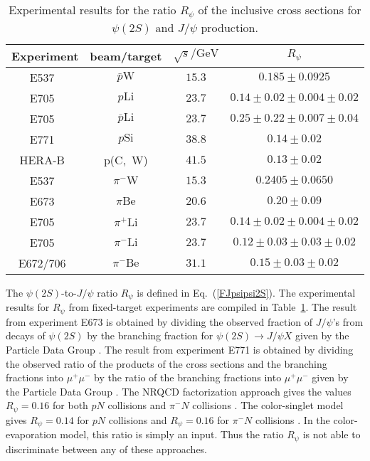 \begin{table}[ht]
\addtolength{\arraycolsep}{0.2cm}
\renewcommand{\arraystretch}{1.25} 
\begin{center}
\begin{tabular}{|c|ccc|} 
\hline
\hline
\mbox{Experiment} & \mbox{beam/target} & $\sqrt{s}/\mbox{GeV}$ & 
$R_\psi$ \\
\hline 
\mbox{E537}~\cite{Tzamarias:1990ij}& $\bar p\mbox{W}$ & $15.3$ 
& $0.185\pm 0.0925$\\ 
\mbox{E705}~\cite{Arenton:pw}& $p\mbox{Li}$ & $23.7$ & $0.14\pm 0.02 \pm 
0.004\pm 0.02$\\ 
\mbox{E705}~\cite{Arenton:pw}& $\bar p\mbox{Li}$ & $23.7$ & $0.25\pm 
0.22 \pm 0.007\pm 0.04$\\ 
\mbox{E771}~\cite{Alexopoulos:1995dt}& $p\mbox{Si}$ & $38.8$
& $0.14\pm 0.02$ \\ 
\mbox{HERA-B}~\cite{Spengler:2004gr} & p\mbox{(C, W)} & $41.5$ 
&$0.13\pm 0.02 $\\ 
\hline
\mbox{E537}~\cite{Tzamarias:1990ij}& $\pi^-\mbox{W}$ & $15.3$ 
& $0.2405\pm 0.0650$\\ 
\mbox{E673}~\cite{Hahn:tz}    & $\pi\mbox{Be}$ &$20.6$&$0.20\pm 0.09$\\ 
\mbox{E705}~\cite{Arenton:pw} & $\pi^+\mbox{Li}$ &$23.7$ &
$0.14\pm 0.02\pm 0.004\pm 0.02$\\ 
\mbox{E705}~\cite{Arenton:pw} & $\pi^-\mbox{Li}$ &$23.7$ &
$0.12\pm 0.03\pm 0.03\pm 0.02$\\ 
\mbox{E672/706}~\cite{Gribushin:1995rt} & $\pi^-\mbox{Be}$ &$31.1$
&$0.15\pm 0.03\pm 0.02$\\ 
\hline
\hline 
\end{tabular}
\end{center}
\caption{\label{tab:psi} 
Experimental results for the ratio $R_\psi$
of the inclusive cross sections for $\psi(2S)$ and $J/\psi$ 
production.}
\end{table} 

The $\psi(2S)$-to-$J/\psi$ ratio $R_\psi$ is defined in Eq.~(\ref{FJpsipsi2S}).
The experimental results for $R_\psi$ from fixed-target experiments
are compiled in Table~\ref{tab:psi}.
The result from experiment E673 is obtained
by dividing the observed fraction of $J/\psi$'s from decays of $\psi(2S)$ 
by the branching fraction for $\psi(2S) \to J/\psi X$
given by the Particle Data Group \cite{Eidelman:2004wy}.
The result from experiment E771
is obtained by dividing the observed ratio of the 
products of the cross sections and the branching fractions into 
$\mu^+ \mu^-$ by the ratio of the branching fractions into $\mu^+ \mu^-$
given by the Particle Data Group \cite{Eidelman:2004wy}.
The NRQCD factorization approach gives the values 
$R_\psi=0.16$ for both $pN$ collisions and $\pi^-N$ collisions
\cite{Beneke:1996tk}.  The color-singlet model gives 
$R_\psi=0.14$ for $pN$ collisions and 
$R_\psi=0.16$ for $\pi^-N$ collisions 
\cite{Beneke:1996tk}. In the color-evaporation model, 
this ratio is simply an input. Thus the ratio $R_\psi$
is not able to discriminate between any of these approaches.


